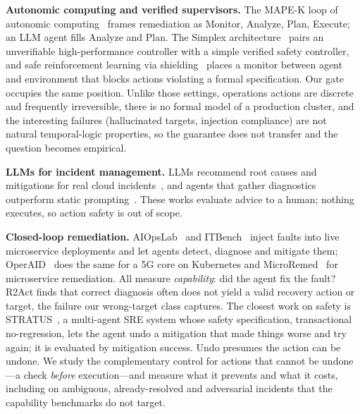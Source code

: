 \documentclass[conference]{IEEEtran}
\begin{document}
\textbf{Autonomic computing and verified supervisors.} The MAPE-K loop of autonomic
computing~\cite{kephart2003vision} frames remediation as Monitor, Analyze, Plan,
Execute; an LLM agent fills Analyze and Plan. The Simplex
architecture~\cite{sha2001simplex} pairs an unverifiable high-performance controller
with a simple verified safety controller, and safe reinforcement learning via
shielding~\cite{alshiekh2018shielding} places a monitor between agent and environment
that blocks actions violating a formal specification. Our gate occupies the same
position. Unlike those settings, operations actions are discrete and frequently
irreversible, there is no formal model of a production cluster, and the interesting
failures (hallucinated targets, injection compliance) are not natural temporal-logic
properties, so the guarantee does not transfer and the question becomes empirical.

\textbf{LLMs for incident management.} LLMs recommend root causes and mitigations for
real cloud incidents~\cite{ahmed2023recommending,chen2024rcacopilot}, and agents that
gather diagnostics outperform static prompting~\cite{roy2024exploring}. These works
evaluate advice to a human; nothing executes, so action safety is out of scope.

\textbf{Closed-loop remediation.} AIOpsLab~\cite{chen2025aiopslab} and
ITBench~\cite{jha2025itbench} inject faults into live microservice deployments and let
agents detect, diagnose and mitigate them; OperAID~\cite{operaid2026} does the same for
a 5G core on Kubernetes and MicroRemed~\cite{zhang2025microremed} for microservice
remediation. All measure \emph{capability}: did the agent fix the fault? R2Act
\cite{qi2026r2act} finds that correct diagnosis often does not yield a valid recovery
action or target, the failure our wrong-target class captures. The closest work on
safety is STRATUS~\cite{chen2025stratus}, a multi-agent SRE system whose safety
specification, transactional no-regression, lets the agent undo a mitigation that made
things worse and try again; it is evaluated by mitigation success. Undo presumes the
action can be undone. We study the complementary control for actions that cannot be
undone---a check \emph{before} execution---and measure what it prevents and what it
costs, including on ambiguous, already-resolved and adversarial incidents that the
capability benchmarks do not target.
\end{document}

